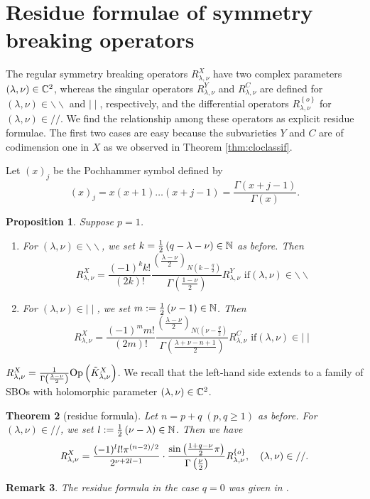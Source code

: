 \documentclass[reqno,12pt]{pja00} %
\makeatletter
\newtheorem{theorem}{Theorem}[section]
\newtheorem{remark}[theorem]{Remark}
\newtheorem*{proposition*}[theorem]{Proposition}
\theoremstyle{definition}
\let\cite\relax
\DeclareRobustCommand{\cite}{%
  \let\new@cite@pre\@gobble
  \@ifnextchar[\new@cite{\@citex[]}}
\def\new@cite[#1]{\@ifnextchar[{\new@citea{#1}}{\@citex[#1]}}
\def\new@citea#1{\def\new@cite@pre{#1}\@citex}
\theoremstyle{exampstyle} \newtheorem{examp}[theorem]{Theorem}
\newcommand{\Op}{\mbox{\normalfont Op}}
\newcommand{\OpR}{\mbox{\it R}}
\makeatother
\begin{document}
\section{Residue formulae of symmetry breaking operators}
The regular symmetry breaking operators $R_{\lambda,\nu}^X$ have two complex parameters $(\lambda,\nu)\in\mathbb{C}^2$, whereas the singular operators $R_{\lambda,\nu}^Y$ and $R_{\lambda,\nu}^C$ are defined
for $(\lambda,\nu)\in\backslash\backslash$ and $\mid\mid$, respectively, and the differential operators $R_{\lambda,\nu}^{ \left\{ o \right\}}$ for $(\lambda,\nu)\in//$. We find the relationship
among these operators as explicit residue formulae. The first two cases are easy because the subvarieties $Y$ and $C$ are of codimension one in $X$ as we observed in Theorem \ref{thm:cloclassif}.

Let $\left( x \right)_j$ be the Pochhammer symbol defined by\begin{equation*}
	\left( x \right)_j=x(x+1)\dots(x+j-1)=\frac{\Gamma(x+j-1)}{\Gamma(x)}.
\end{equation*}
\begin{proposition*}
	Suppose $p=1$.\begin{enumerate}[(1)]
		\item For $(\lambda,\nu)\in\backslash\backslash$, we set $k=\frac{1}{2}\left( q-\lambda-\nu \right)\in\mathbb{N}$ as before. Then
\begin{equation*}
R_{\lambda,\nu}^X=\frac{(-1)^kk!}{(2k)!}\frac{\left( \frac{\lambda-\nu}{2} \right)_{N\left(k-\frac{q}{2}  \right)}}{\Gamma\left( \frac{1-\nu}{2}\right) }R_{\lambda,\nu}^Y\mbox{ if}(\lambda,\nu)\in\backslash\backslash
\end{equation*}
\item For $(\lambda,\nu)\in\mid\mid$, we set $m:=\frac{1}{2}\left( \nu-1 \right)\in\mathbb{N}$. Then
\begin{equation*}
R_{\lambda,\nu}^X=\frac{(-1)^mm!}{(2m)!}\frac{\left( \frac{\lambda-\nu}{2} \right)_{N(\left( \nu-\frac{q}{2} \right)}}{\Gamma\left( \frac{\lambda+\nu-n+1}{2}\right)}R_{\lambda,\nu}^C\mbox{ if}(\lambda,\nu)\in\mid\mid
\end{equation*}
	\end{enumerate}
\end{proposition*}

$R_{\lambda,\nu}^X=\frac{1}{\Gamma\left( \frac{\lambda-\nu}{2} \right)}\Op\left( \tilde{K}_{\lambda,\nu}^X \right)$. We recall that the left-hand side extends to a family of SBOs with holomorphic
parameter $(\lambda,\nu)\in\mathbb{C}^2$.
\begin{theorem}[residue formula]
	Let $n=p+q\;(p,q\ge1)$ as before.
	For $(\lambda,\nu)\in//$, we set $l:=\frac{1}{2}\left( \nu-\lambda \right)\in\mathbb{N}$. Then we have
  \[\OpR_{\lambda,\nu}^X  = \frac{ (- 1)^l l!\pi^{(n - 2) / 2} 
		}{2^{ \nu + 2 l-1}}\cdot  \frac{\sin\left( \frac{1+q-\nu}{2}\pi \right)}{\Gamma\left( \frac{\nu}{2} \right)}
     \OpR_{\lambda,\nu}^{ \left\{ o \right\} },\quad(\lambda,\nu)\in// . \]
	\end{theorem}
	\begin{remark}
		The residue formula in the case $q=0$ was given in \cite[Thm. 12.2]{kobayashi2015symmetry}.
	\end{remark}
\end{document}
